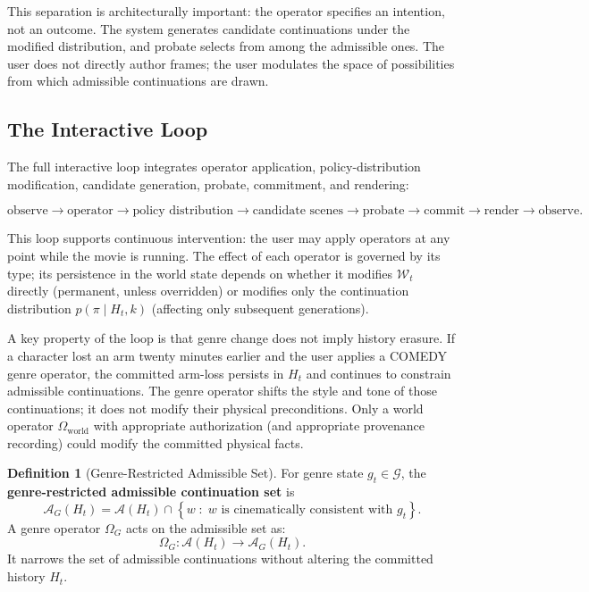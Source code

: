 \documentclass[11pt,a4paper]{article}
\theoremstyle{plain}
\theoremstyle{definition}
\newtheorem{definition}[theorem]{Definition}
\theoremstyle{remark}
\begin{document}
This separation is architecturally important: the operator specifies an intention, not an outcome. The system generates candidate continuations under the modified distribution, and probate selects from among the admissible ones. The user does not directly author frames; the user modulates the space of possibilities from which admissible continuations are drawn.

\subsection{The Interactive Loop}

The full interactive loop integrates operator application, policy-distribution modification, candidate generation, probate, commitment, and rendering:

\[
\text{observe} \to \text{operator} \to \text{policy distribution} \to \text{candidate scenes} \to \text{probate} \to \text{commit} \to \text{render} \to \text{observe}.
\]

This loop supports continuous intervention: the user may apply operators at any point while the movie is running. The effect of each operator is governed by its type; its persistence in the world state depends on whether it modifies $\mathcal{W}_t$ directly (permanent, unless overridden) or modifies only the continuation distribution $p(\pi \mid H_t, k)$ (affecting only subsequent generations).

A key property of the loop is that genre change does not imply history erasure. If a character lost an arm twenty minutes earlier and the user applies a \textsc{COMEDY} genre operator, the committed arm-loss persists in $H_t$ and continues to constrain admissible continuations. The genre operator shifts the style and tone of those continuations; it does not modify their physical preconditions. Only a world operator $\Omega_{\mathrm{world}}$ with appropriate authorization (and appropriate provenance recording) could modify the committed physical facts.

\begin{definition}[Genre-Restricted Admissible Set]
For genre state $g_t \in \mathcal{G}$, the \textbf{genre-restricted admissible continuation set} is
\[
\mathcal{A}_G(H_t) = \mathcal{A}(H_t) \cap \left\{ w \;:\; w \text{ is cinematically consistent with } g_t \right\}.
\]
A genre operator $\Omega_G$ acts on the admissible set as:
\[
\Omega_G : \mathcal{A}(H_t) \to \mathcal{A}_G(H_t).
\]
It narrows the set of admissible continuations without altering the committed history $H_t$.
\end{definition}
\end{document}
